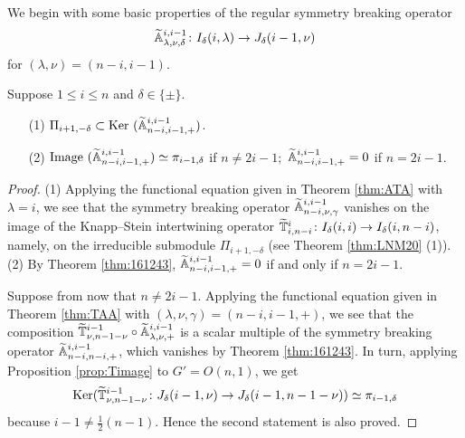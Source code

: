 We begin with some basic properties
 of the regular symmetry breaking operator
\[
   {\widetilde{\mathbb{A}}}_{{\lambda},{\nu},{\delta}}^{{i,i-1}} \colon
 I_\delta(i,\lambda) \to J_\delta (i-1,\nu)
\]
for $(\lambda,\nu)=(n-i,i-1)$.  

\begin{proposition}
\label{prop:Aii1ker}
Suppose $1 \le i \le n$ and $\delta \in \{\pm\}$.  
\begin{enumerate}
\item[{\rm{(1)}}]
$\Pi_{i+1,-\delta} \subset{\operatorname{Ker}}~({\widetilde{\mathbb{A}}}_{{n-i},{i-1},{+}}^{{i,i-1}})$.  
\item[{\rm{(2)}}]
${\operatorname{Image}}~({\widetilde{\mathbb{A}}}_{{n-i},{i-1},{+}}^{{i,i-1}}) \simeq \pi_{i-1,\delta}$
 if $n \ne 2i-1 ;$
${\widetilde{\mathbb{A}}}_{{n-i},{i-1},{+}}^{{i,i-1}} =0$
 if $n = 2i-1$.  
\end{enumerate}
\end{proposition}
\begin{proof}
(1)\enspace
Applying the functional equation
 given in Theorem \ref{thm:ATA} with $\lambda=i$, 
 we see that the symmetry breaking operator ${\widetilde{\mathbb{A}}}_{{n-i},{\nu},{\gamma}}^{{i,i-1}}$ vanishes 
 on the image of the Knapp--Stein intertwining operator
 $\widetilde{{\mathbb{T}}}_{{i},{n-i}}^{{i}} \colon I_{\delta}(i,i) \to I_{\delta}(i,n-i)$, 
 namely, 
 on the irreducible submodule $\Pi_{i+1,-\delta}$
 (see Theorem \ref{thm:LNM20} (1)).  
\newline\noindent
{\rm{(2)}}\enspace
By Theorem \ref{thm:161243}, 
 ${\widetilde{\mathbb{A}}}_{{n-i},{i-1},{+}}^{{i,i-1}}=0$
 if and only if $n=2i-1$.  



Suppose from now 
 that $n \ne 2i-1$.  
Applying the functional equation given in Theorem \ref{thm:TAA} with $(\lambda, \nu, \gamma)=(n-i,i-1,+)$, 
 we see that the composition 
 $\widetilde{{\mathbb{T}}}_{{\nu},{n-1-\nu}}^{{i-1}} \circ {\widetilde{\mathbb{A}}}_{{\lambda},{\nu},{+}}^{{i,i-1}}$
 is a scalar multiple of the symmetry breaking operator ${\widetilde{\mathbb{A}}}_{{n-i},{n-i},{+}}^{{i,i-1}}$, 
 which vanishes by Theorem \ref{thm:161243}.  
In turn, 
 applying Proposition \ref{prop:Timage} to $G'=O(n,1)$, 
 we get
\[
    {\operatorname{Ker}}(\widetilde{{\mathbb{T}}}_{{\nu},{n-1-\nu}}^{{i-1}} \colon
                         J_{\delta}(i-1,\nu) \to J_{\delta}(i-1,n-1-\nu))
    \simeq \pi_{i-1,\delta}
\]
 because $i-1 \ne \frac 1 2(n-1)$. 
Hence the second statement is also proved.  
\end{proof}



